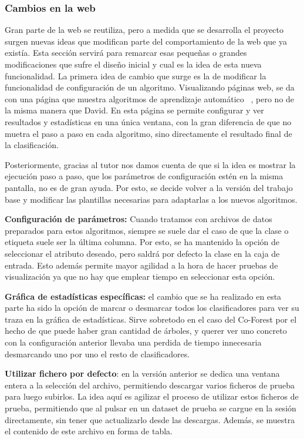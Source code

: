 \subsubsection{Cambios en la web}
Gran parte de la web se reutiliza, pero a medida que se desarrolla el proyecto surgen nuevas ideas que modifican parte del comportamiento de la web que ya existía. Esta sección servirá para remarcar esas pequeñas o grandes modificaciones que sufre el diseño inicial y cual es la idea de esta nueva funcionalidad. 
La primera idea de cambio que surge es la de modificar la funcionalidad de configuración de un algoritmo. Visualizando páginas web, se da con una página que muestra algoritmos de aprendizaje automático~ \cite{web:ml-visualizer}, pero no de la misma manera que David. En esta página se permite configurar y ver resultados y estadísticas en una única ventana, con la gran diferencia de que no muetra el paso a paso en cada algoritmo, sino directamente el resultado final de la clasificación.

Posteriormente, gracias al tutor nos damos cuenta de que si la idea es mostrar la ejecución paso a paso, que los parámetros de configuración estén en la misma pantalla, no es de gran ayuda. Por esto, se decide volver a la versión del trabajo base y modificar las plantillas necesarias para adaptarlas a los nuevos algoritmos.

\textbf{Configuración de parámetros:} Cuando tratamos con archivos de datos preparados para estos algoritmos, siempre se suele dar el caso de que la clase o etiqueta suele ser la última columna. Por esto, se ha mantenido la opción de seleccionar el atributo deseado, pero saldrá por defecto la clase en la caja de entrada. Esto además permite mayor agilidad a la hora de hacer pruebas de visualización ya que no hay que emplear tiempo en seleccionar esta opción.

\textbf{Gráfica de estadísticas específicas:} el cambio que se ha realizado en esta parte ha sido la opción de marcar o desmarcar todos los clasificadores para ver su traza en la gráfica de estadísticas. Sirve sobretodo en el caso del Co-Forest por el hecho de que puede haber gran cantidad de árboles, y querer ver uno concreto con la configuración anterior llevaba una perdida de tiempo innecesaria desmarcando uno por uno el resto de clasificadores.

\textbf{Utilizar fichero por defecto}: en la versión anterior se dedica una ventana entera a la selección del archivo, permitiendo descargar varios ficheros de prueba para luego subirlos. La idea aquí es agilizar el proceso de utilizar estos ficheros de prueba, permitiendo que al pulsar en un dataset de prueba se cargue en la sesión directamente, sin tener que actualizarlo desde las descargas. Además, se muestra el contenido de este archivo en forma de tabla.

